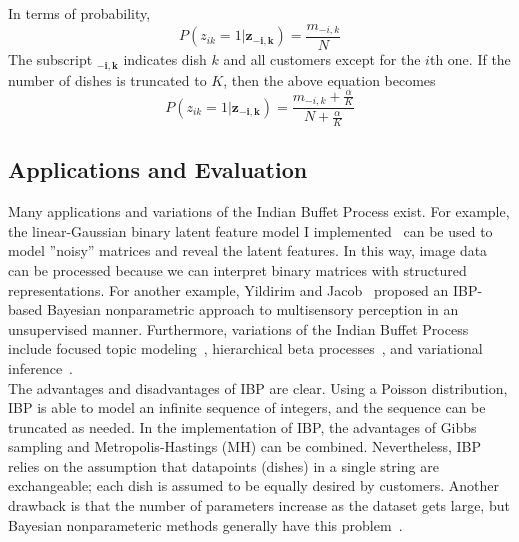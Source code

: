 In terms of probability, 
\begin{equation*}
P(z_{ik}=1 | \mathbf{z_{-i,k}}) = \displaystyle \frac{m_{-i,k}}{N}
\end{equation*}
The subscript $\mathbf{_{-i,k}}$ indicates dish $k$ and all customers except for the $i$th one. If the number of dishes is truncated to $K$, then the above equation becomes
\begin{equation*}
P(z_{ik}=1 | \mathbf{z_{-i,k}}) = \displaystyle \frac{m_{-i,k} + \frac{\alpha}{K}}{N + \frac{\alpha}{K}}
\end{equation*}

\subsection{Applications and Evaluation}
Many applications and variations of the Indian Buffet Process exist. For example, the linear-Gaussian binary latent feature model I implemented~\cite{ibp2012matlab} can be used to model ''noisy'' matrices and reveal the latent features. In this way, image data can be processed because we can interpret binary matrices with structured representations. For another example, Yildirim and Jacob~\cite{yildirimbayesian} proposed an IBP-based Bayesian nonparametric approach to multisensory perception in an unsupervised manner. Furthermore, variations of the Indian Buffet Process include focused topic modeling~\cite{williamson2009focused}, hierarchical beta processes~\cite{williamson2009focused}, and variational inference~\cite{doshi2008variational}. \\

The advantages and disadvantages of IBP are clear. Using a Poisson distribution, IBP is able to model an infinite sequence of integers, and the sequence can be truncated as needed. In the implementation of IBP, the advantages of Gibbs sampling and Metropolis-Hastings (MH) can be combined. Nevertheless, IBP relies on the assumption that datapoints (dishes) in a single string are exchangeable; each dish is assumed to be equally desired by customers. Another drawback is that the number of parameters increase as the dataset gets large, but Bayesian nonparameteric methods generally have this problem~\cite{ibp2012matlab}.
